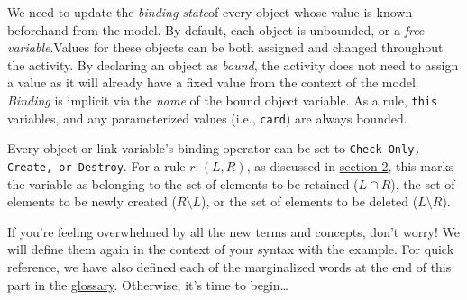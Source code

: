 We need to update the \emph{binding state}of every object whose value is known beforehand from the model. By default, each object is
unbounded, or a \emph{free variable}.Values for these objects can be both assigned and changed throughout the activity. By declaring
an object as \emph{bound}, the activity does not need to assign a value as it will already have a fixed value from the context of the model. \emph{Binding} is
implicit via the \emph{name} of the bound object variable. As a rule, \texttt{this} variables, and any parameterized values (i.e.,
\texttt{card}) are always bounded.

Every object or link variable's binding operator can be set to \texttt{Check Only, Create, or Destroy}. For a rule $r: (L, R)$, as discussed in
\hyperlink{explanation}{section 2}, this marks the variable as belonging to the set of elements to be retained ($L\cap R$), the set of elements to be newly
created ($R\setminus L$), or the set of elements to be deleted ($L\setminus R$).

If you're feeling overwhelmed by all the new terms and concepts, don't worry! We will define them again in the context of your syntax with the example. For
quick reference, we have also defined each of the marginalized words at the end of this part in the \hyperlink{glossary}{glossary}. Otherwise, it's time
to begin\ldots






